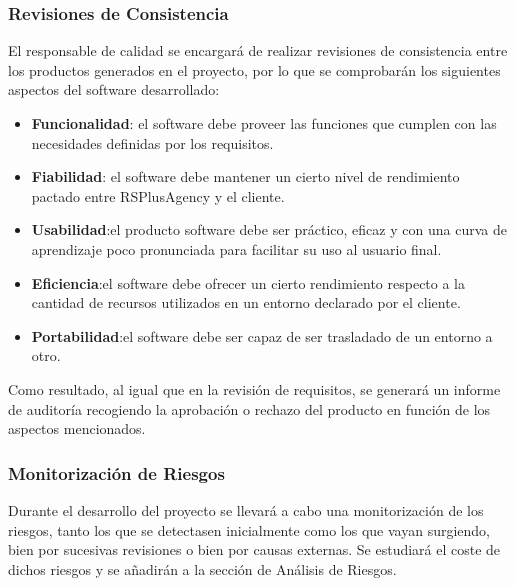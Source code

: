 \subsubsection{Revisiones de Consistencia}
\par El responsable de calidad se encargará de realizar revisiones de consistencia entre los productos generados en el proyecto, por lo que se comprobarán los siguientes aspectos del software desarrollado:

\begin{itemize}
\item \textbf{Funcionalidad}: el software debe proveer las funciones que cumplen con las necesidades definidas por los requisitos.
\item \textbf{Fiabilidad}: el software debe mantener un cierto nivel de rendimiento pactado entre RSPlusAgency y el cliente.
\item \textbf{Usabilidad}:el producto software debe ser práctico, eficaz y con una curva de aprendizaje poco pronunciada para facilitar su uso al usuario final.
\item \textbf{Eficiencia}:el software debe ofrecer un cierto rendimiento respecto a la cantidad de recursos utilizados en un entorno declarado por el cliente.
\item \textbf{Portabilidad}:el software debe ser capaz de ser trasladado de un entorno a otro.
\end{itemize}

\par Como resultado, al igual que en la revisión de requisitos, se generará un informe de auditoría recogiendo la aprobación o rechazo del producto en función de los aspectos mencionados.

\subsubsection{Monitorización de Riesgos}
\par Durante el desarrollo del proyecto se llevará a cabo una monitorización de los riesgos, tanto los que se detectasen inicialmente como los que vayan surgiendo, bien por sucesivas revisiones o bien por causas externas. Se estudiará el coste de dichos riesgos y se añadirán a la sección de Análisis de Riesgos.
